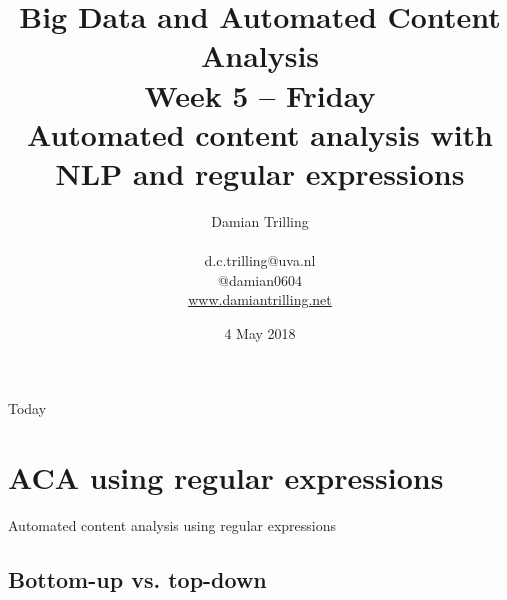 \documentclass{beamer}
\begin{document}
\title[Big Data and Automated Content Analysis]{\textbf{Big Data and Automated Content Analysis} \\ Week 5 -- Friday \\ Automated content analysis with NLP and regular expressions}
\author[Damian Trilling]{Damian Trilling \\ ~ \\ \footnotesize{d.c.trilling@uva.nl \\@damian0604} \\ \url{www.damiantrilling.net}}
\date{4 May 2018}

\begin{frame}[plain]{}
\titlepage
\end{frame}

\begin{frame}{Today}
\tableofcontents
\end{frame}



\section[Regular expressions]{ACA using regular expressions}

\begin{frame}
Automated content analysis using regular expressions
\end{frame}


\subsection{Bottom-up vs. top-down}
\end{document}
